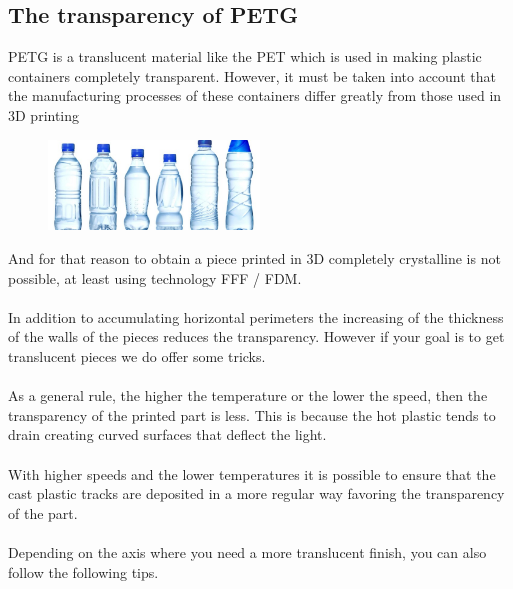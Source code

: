 \documentclass[11pt,a4paper]{article}
\begin{document}
	\subsection{The transparency of PETG}PETG is a translucent material like the PET which is used in making plastic containers completely transparent. However, it must be taken into account that the manufacturing processes of these containers differ greatly from those used in 3D printing
\begin{figure}[H]
\centering
\includegraphics[width=0.5\textwidth,cfbox=azul_marcos 1pt 0pt]{FOTOS/BOTELLASPET}
\end{figure}
 And for that reason to obtain a piece printed in 3D completely crystalline is not possible, at least using technology FFF / FDM.
\\\\
In addition to accumulating horizontal perimeters the increasing of the thickness of the walls of the pieces reduces the transparency. However if your goal is to get translucent pieces we do offer some tricks.
\\\\
As a general rule, the higher the temperature or the lower the speed, then the transparency of the printed part is less. This is because the hot plastic tends to drain creating curved surfaces that deflect the light.
\\\\
With higher speeds and the lower temperatures it is possible to ensure that the cast plastic tracks are deposited in a more regular way favoring the transparency of the part.
\\\\
	Depending on the axis where you need a more translucent finish, you can also follow the following tips.
\end{document}
